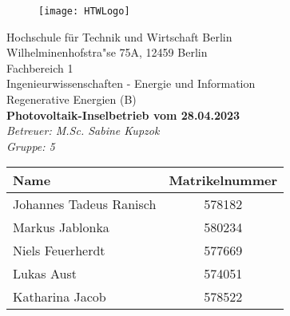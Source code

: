 \begin{titlepage}

		\begin{figure}[h] 
				\begin{flushright}
			\texttt{[image: HTWLogo]}\\
				\end{flushright}
		\end{figure}
		
	\begin{center}
		\vspace*{\fill}
		{\Large Hochschule f{\"u}r Technik und Wirtschaft Berlin}\\
			\bigskip
			Wilhelminenhofstra"se 75A, 12459 Berlin\\
			\bigskip
		Fachbereich 1 \\Ingenieurwissenschaften - Energie und Information\\Regenerative Energien (B)\\
		\vfill
		 \textcolor{HTWGreen}{\textbf{\Large{Photovoltaik-Inselbetrieb vom 28.04.2023}}}\\
		\textit{Betreuer: M.Sc. Sabine Kupzok}\\
		\textit{Gruppe: 5}\\
	\vfill
	\end{center}
\vfill
\begin{table}[H]
			\centering
			\begin{tabular}{|l|c|}
			\hline
			\rowcolor[cmyk]{0.55, 0.00, 1.00, 0.00} \textbf{Name} & \textbf{Matrikelnummer}  \\
			\hline
			Johannes Tadeus Ranisch& 578182\\
			\hline
			Markus Jablonka        & 580234\\
			\hline
			Niels Feuerherdt       & 577669\\
			\hline
			Lukas Aust  		 	   & 574051\\
			\hline
			Katharina Jacob 		   &578522\\
			\hline
			\end{tabular}
			\end{table}
\end{titlepage}
